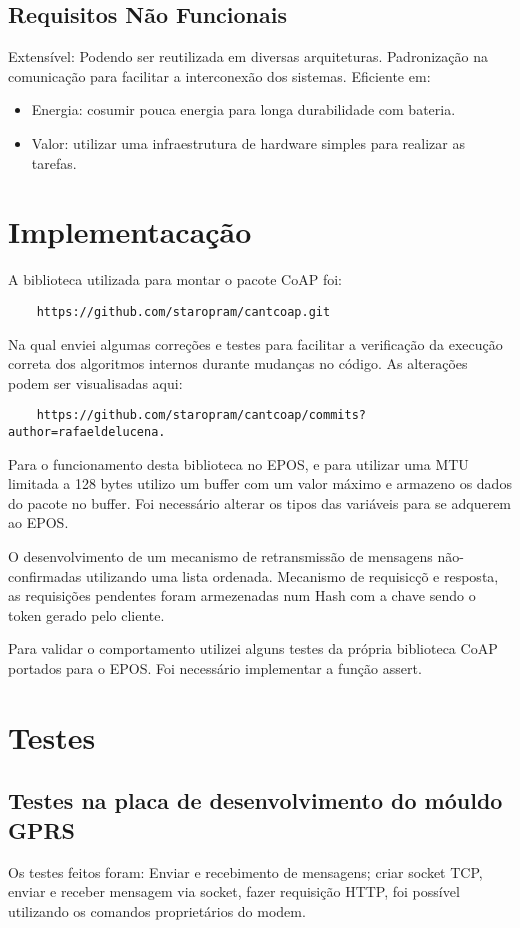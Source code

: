 \subsection{Requisitos N\~ao Funcionais}{

Extens\'ivel: Podendo ser reutilizada em diversas arquiteturas.
Padroniza\c{c}\~ao na comunica\c{c}\~ao para facilitar a interconex\~ao dos sistemas.
Eficiente em:
    \begin{itemize}
        \item Energia: cosumir pouca energia para longa durabilidade com bateria.
        \item Valor: utilizar uma infraestrutura de hardware simples para realizar as tarefas.
    \end{itemize}
}

\section{Implementaca\c{c}\~ao}
A biblioteca utilizada para montar o pacote CoAP foi:
\begin{lstlisting}
    https://github.com/staropram/cantcoap.git
 \end{lstlisting} Na qual enviei algumas corre\c{c}\~oes e testes para facilitar a verifica\c{c}\~ao da execu\c{c}\~ao correta dos algoritmos internos durante mudan\c{c}as no c\'odigo. As altera\c{c}\~oes podem ser visualisadas aqui: \begin{lstlisting}
    https://github.com/staropram/cantcoap/commits?author=rafaeldelucena.
\end{lstlisting}

Para o funcionamento desta biblioteca no EPOS, e para utilizar uma MTU limitada a 128 bytes utilizo um buffer com um valor m\'aximo e armazeno os dados do pacote no buffer. Foi necess\'ario alterar os tipos das vari\'aveis para se adquerem ao EPOS.

O desenvolvimento de um mecanismo de retransmiss\~ao de mensagens n\~ao-confirmadas utilizando uma lista ordenada. Mecanismo de requisic\c{c}\~o e resposta, as requisi\c{c}\~oes pendentes foram armezenadas num Hash com a chave sendo o token gerado pelo cliente.

Para validar o comportamento utilizei alguns testes da pr\'opria biblioteca CoAP portados para o EPOS. Foi necess\'ario implementar a fun\c{c}\~ao assert.
\section{Testes}
\subsection{Testes na placa de desenvolvimento do m\'ouldo GPRS}{
    Os testes feitos foram: Enviar e recebimento de mensagens; criar socket TCP, enviar e receber mensagem via socket, fazer requisi\c{c}\~ao HTTP, foi poss\'ivel utilizando os comandos propriet\'arios do modem.}
